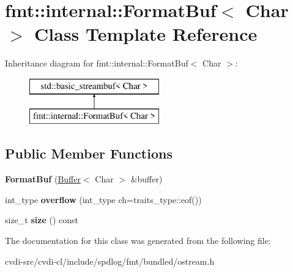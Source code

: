 \hypertarget{classfmt_1_1internal_1_1FormatBuf}{}\section{fmt\+:\+:internal\+:\+:Format\+Buf$<$ Char $>$ Class Template Reference}
\label{classfmt_1_1internal_1_1FormatBuf}
Inheritance diagram for fmt\+:\+:internal\+:\+:Format\+Buf$<$ Char $>$\+:\begin{figure}[H]
\begin{center}
\leavevmode
\includegraphics[height=2.000000cm]{classfmt_1_1internal_1_1FormatBuf}
\end{center}
\end{figure}
\subsection*{Public Member Functions}
\begin{DoxyCompactItemize}
\item 
{\bfseries Format\+Buf} (\hyperlink{classfmt_1_1Buffer}{Buffer}$<$ Char $>$ \&buffer)\hypertarget{classfmt_1_1internal_1_1FormatBuf_adcbde95f2bfaffd93ec7f39ae5636bfb}{}\label{classfmt_1_1internal_1_1FormatBuf_adcbde95f2bfaffd93ec7f39ae5636bfb}

\item 
int\+\_\+type {\bfseries overflow} (int\+\_\+type ch=traits\+\_\+type\+::eof())\hypertarget{classfmt_1_1internal_1_1FormatBuf_af5f472241b45d828a8d40cea7694c95c}{}\label{classfmt_1_1internal_1_1FormatBuf_af5f472241b45d828a8d40cea7694c95c}

\item 
size\+\_\+t {\bfseries size} () const \hypertarget{classfmt_1_1internal_1_1FormatBuf_a37d9219b491e9f05f22334b60cf41c5f}{}\label{classfmt_1_1internal_1_1FormatBuf_a37d9219b491e9f05f22334b60cf41c5f}

\end{DoxyCompactItemize}


The documentation for this class was generated from the following file\+:\begin{DoxyCompactItemize}
\item 
cvdi-\/src/cvdi-\/cl/include/spdlog/fmt/bundled/ostream.\+h\end{DoxyCompactItemize}
